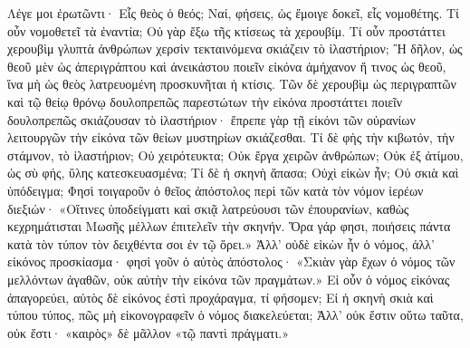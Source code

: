 \documentclass[10pt]{book}
\newcommand{\switchEnglish}{\selectlanguage{english} \switchcolumn}
\begin{document}
\begin{paracol}{2}
Λέγε μοι ἐρωτῶντι· Εἷς θεὸς ὁ θεός; Ναί, φήσεις, ὡς ἔμοιγε δοκεῖ, εἷς νομοθέτης.
Τί οὖν νομοθετεῖ τὰ ἐναντία; Οὐ γὰρ ἔξω τῆς κτίσεως τὰ χερουβίμ.
Τί οὖν προστάττει χερουβὶμ γλυπτὰ ἀνθρώπων χερσὶν τεκταινόμενα σκιάζειν τὸ ἱλαστήριον; Ἢ δῆλον, ὡς θεοῦ μὲν ὡς ἀπεριγράπτου καὶ ἀνεικάστου ποιεῖν εἰκόνα ἀμήχανον ἤ τινος ὡς θεοῦ, ἵνα μὴ ὡς θεὸς λατρευομένη προσκυνῆται ἡ κτίσις.
Τῶν δὲ χερουβὶμ ὡς περιγραπτῶν καὶ τῷ θείῳ θρόνῳ δουλοπρεπῶς παρεστώτων τὴν εἰκόνα προστάττει ποιεῖν δουλοπρεπῶς σκιάζουσαν τὸ ἱλαστήριον· ἔπρεπε γὰρ τῇ εἰκόνι τῶν οὐρανίων λειτουργῶν τὴν εἰκόνα τῶν θείων μυστηρίων σκιάζεσθαι.
Τί δὲ φὴς τὴν κιβωτόν, τὴν στάμνον, τὸ ἱλαστήριον; Οὐ χειρότευκτα; Οὐκ ἔργα χειρῶν ἀνθρώπων; Οὐκ ἐξ ἀτίμου, ὡς σὺ φής, ὕλης κατεσκευασμένα; Τί δὲ ἡ σκηνὴ ἅπασα; Οὐχὶ εἰκὼν ἦν; Οὐ σκιὰ καὶ ὑπόδειγμα; Φησὶ τοιγαροῦν ὁ θεῖος ἀπόστολος περὶ τῶν κατὰ τὸν νόμον ἱερέων διεξιών· «Οἵτινες ὑποδείγματι καὶ σκιᾷ λατρεύουσι τῶν ἐπουρανίων, καθὼς κεχρημάτισται Μωσῆς μέλλων ἐπιτελεῖν τὴν σκηνήν.
Ὅρα γάρ φησι, ποιήσεις πάντα κατὰ τὸν τύπον τὸν δειχθέντα σοι ἐν τῷ ὄρει.» Ἀλλ’ οὐδὲ εἰκὼν ἦν ὁ νόμος, ἀλλ’ εἰκόνος προσκίασμα· φησὶ γοῦν ὁ αὐτὸς ἀπόστολος· «Σκιὰν γὰρ ἔχων ὁ νόμος τῶν μελλόντων ἀγαθῶν, οὐκ αὐτὴν τὴν εἰκόνα τῶν πραγμάτων.» Εἰ οὖν ὁ νόμος εἰκόνας ἀπαγορεύει, αὐτὸς δὲ εἰκόνος ἐστὶ προχάραγμα, τί φήσομεν; Εἰ ἡ σκηνὴ σκιὰ καὶ τύπου τύπος, πῶς μὴ εἰκονογραφεῖν ὁ νόμος διακελεύεται; Ἀλλ’ οὐκ ἔστιν οὕτω ταῦτα, οὐκ ἔστι· «καιρὸς» δὲ μᾶλλον «τῷ παντὶ πράγματι.»

\switchEnglish



\end{paracol}
\end{document}
